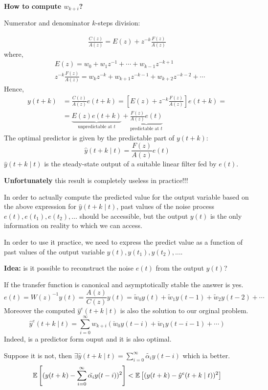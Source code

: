 \textbf{How to compute $w_{k+i}$?}

Numerator and denominator $k$-steps division:

\begin{align*}
	\frac{C(z)}{A(z)}=E(z)+z^{-k} \frac{F(z)}{A(z)}
\end{align*}
where,
\begin{align*}
	&E(z)=w_{0}+w_{1} z^{-1}+\cdots+w_{k-1} z^{-k+1} \\
	&z^{-k} \frac{F(z)}{A(z)}=w_{k} z^{-k}+w_{k+1} z^{-k-1}+w_{k+2} z^{-k-2}+\cdots
\end{align*}
Hence,
\begin{align*}
	y(t+k) &=\frac{C(z)}{A(z)} e(t+k)=\left[E(z)+z^{-k} \frac{F(z)}{A(z)}\right] e(t+k)=\\
	&=\underbrace{E(z)e(t+k)}_{\text{unpredictable at }t}+\underbrace{\frac{F(z)}{A(z)}e(t)}_{\text{predictable at }t}
\end{align*}
The optimal predictor is given by the predictable part of $y(t + k)$:
$$
\hat{y}(t+k \mid t) = \frac{F(z)}{A(z)}e(t)
$$
$\hat{y}(t+k \mid t)$ is the steady-state output of a suitable linear filter 
fed by $e(t)$.

\textbf{Unfortunately} this result is 
completely useless in practice!!! 

In order to actually compute the predicted value for the output 
variable based on the above expression for $\hat{y}(t+k \mid t)$, past values of the noise process $e(t),e(t_1),e(t_2),\ldots$ should be accessible, but the output $y(t)$ is the only 
information on reality to 
which we can access.

In order to use it practice, we need to express the predict value as a 
function of past values of the output variable $y(t), y(t_1), y(t_2),\ldots$.

\textbf{Idea:} is it possible to reconstruct 
the noise $e(t)$ from the output $y(t)$? 

If the transfer function is canonical and asymptotically stable the answer is yes.
$$
e(t)=W(z)^{-1} y(t)=\frac{A(z)}{C(z)} y(t)=\widetilde{w}_{0} y(t)+\widetilde{w}_{1} y(t-1)+\widetilde{w}_{2} y(t-2)+\cdots
$$
Moreover the computed $\hat{y}^e(t+k \mid t)$ is also the solution to our orginal problem.
$$
\hat{y}^e(t+k \mid t)=\sum_{i=0}^{\infty} w_{k+i}\left(\breve{w}_{0} y(t-i)+\breve{w}_{1} y(t-i-1)+\cdots\right)
$$
Indeed, is a predictor form ouput and it is also optimal.

Suppose it is not, then $\exists \hat{y}(t+k \mid t)=\sum_{i=0}^{\infty} \tilde{\alpha_i}y(t-i)$ which ia better.
$$
\mathbb{E}\left[(y(t+k)-\sum_{i=0}^{\infty} \tilde{\alpha_i}y(t-i))^2\right]<\mathbb{E}\left[(y(t+k)-\hat{y}^e(t+k \mid t))^{2}\right]
$$

 